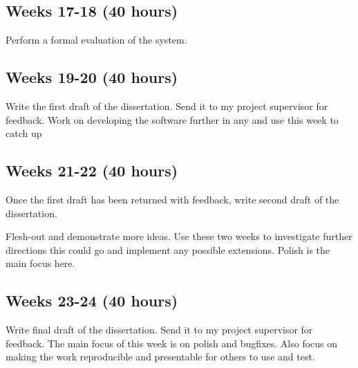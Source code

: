 \documentclass[11pt]{article}
\begin{document}
\subsection{Weeks 17-18 (40 hours)}

Perform a formal evaluation of the system.

\subsection{Weeks 19-20 (40 hours)}

Write the first draft of the dissertation. Send it to my project supervisor for
feedback. Work on developing the software further in any and use this week to
catch up

\subsection{Weeks 21-22 (40 hours)}

Once the first draft has been returned with feedback, write second draft of the
dissertation.

Flesh-out and demonstrate more ideas. Use these two weeks to investigate
further directions this could go and implement any possible extensions. Polish
is the main focus here.

\subsection{Weeks 23-24 (40 hours)}

Write final draft of the dissertation. Send it to my project supervisor for
feedback. The main focus of this week is on polish and bugfixes. Also focus on
making the work reproducible and presentable for others to use and test.


\end{document}
